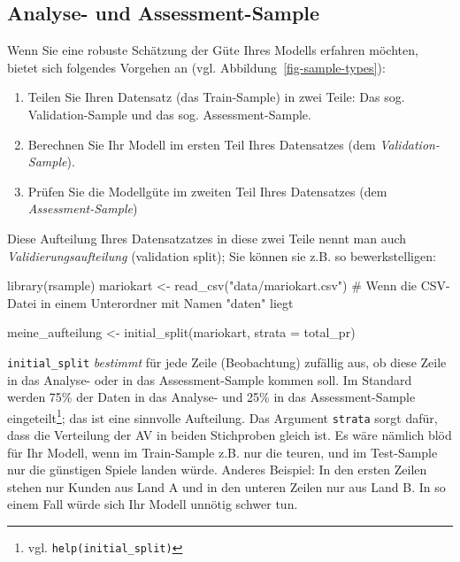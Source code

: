 \documentclass[
  letterpaper,
  twoside,
  open=any]{scrbook}
\newenvironment{Shaded}{\begin{snugshade}}{\end{snugshade}}
\newcommand{\AttributeTok}[1]{\textcolor[rgb]{0.40,0.45,0.13}{#1}}
\newcommand{\CommentTok}[1]{\textcolor[rgb]{0.37,0.37,0.37}{#1}}
\newcommand{\FunctionTok}[1]{\textcolor[rgb]{0.28,0.35,0.67}{#1}}
\newcommand{\NormalTok}[1]{\textcolor[rgb]{0.00,0.23,0.31}{#1}}
\newcommand{\OtherTok}[1]{\textcolor[rgb]{0.00,0.23,0.31}{#1}}
\newcommand{\StringTok}[1]{\textcolor[rgb]{0.13,0.47,0.30}{#1}}
\providecommand{\tightlist}{%
  \setlength{\itemsep}{0pt}\setlength{\parskip}{0pt}}\usepackage{longtable,booktabs,array}
\theoremstyle{definition}
\theoremstyle{definition}
\theoremstyle{definition}
\theoremstyle{remark}
\begin{document}
\subsection{Analyse- und
Assessment-Sample}\label{analyse--und-assessment-sample}

Wenn Sie eine robuste Schätzung der Güte Ihres Modells erfahren möchten,
bietet sich folgendes Vorgehen an (vgl.
Abbildung~\ref{fig-sample-types}):

\begin{enumerate}
\def\labelenumi{\arabic{enumi}.}
\tightlist
\item
  Teilen Sie Ihren Datensatz (das Train-Sample) in zwei Teile: Das sog.
  Validation-Sample und das sog. Assessment-Sample.
\item
  Berechnen Sie Ihr Modell im ersten Teil Ihres Datensatzes (dem
  \emph{Validation-Sample}).
\item
  Prüfen Sie die Modellgüte im zweiten Teil Ihres Datensatzes (dem
  \emph{Assessment-Sample})
\end{enumerate}

Diese Aufteilung Ihres Datensatzatzes in diese zwei Teile nennt man auch
\emph{Validierungsaufteilung} (validation split); Sie können sie z.B. so
bewerkstelligen:

\begin{Shaded}
\begin{Highlighting}[]
\FunctionTok{library}\NormalTok{(rsample)}
\NormalTok{mariokart }\OtherTok{\textless{}{-}} \FunctionTok{read\_csv}\NormalTok{(}\StringTok{"data/mariokart.csv"}\NormalTok{)  }\CommentTok{\# Wenn die CSV{-}Datei in einem Unterordner mit Namen "daten" liegt}

\NormalTok{meine\_aufteilung }\OtherTok{\textless{}{-}} \FunctionTok{initial\_split}\NormalTok{(mariokart, }\AttributeTok{strata =}\NormalTok{ total\_pr)}
\end{Highlighting}
\end{Shaded}

\texttt{initial\_split} \emph{bestimmt} für jede Zeile (Beobachtung)
zufällig aus, ob diese Zeile in das Analyse- oder in das
Assessment-Sample kommen soll. Im Standard werden 75\% der Daten in das
Analyse- und 25\% in das Assessment-Sample eingeteilt\footnote{vgl.
  \texttt{help(initial\_split)}}; das ist eine sinnvolle Aufteilung. Das
Argument \texttt{strata} sorgt dafür, dass die Verteilung der AV in
beiden Stichproben gleich ist. Es wäre nämlich blöd für Ihr Modell, wenn
im Train-Sample z.B. nur die teuren, und im Test-Sample nur die
günstigen Spiele landen würde. Anderes Beispiel: In den ersten Zeilen
stehen nur Kunden aus Land A und in den unteren Zeilen nur aus Land B.
In so einem Fall würde sich Ihr Modell unnötig schwer tun.
\end{document}
